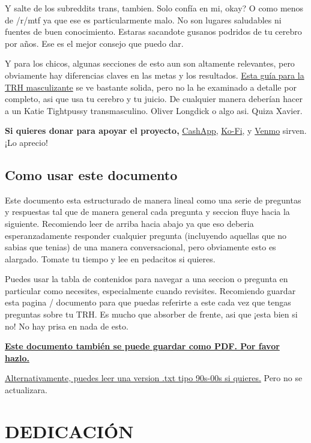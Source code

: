 \documentclass{article}
\begin{document}
Y salte de los subreddits trans, tambien. Solo confía en mi, okay? O como menos de /r/mtf ya que ese es particularmente malo. No son lugares saludables ni fuentes de buen conocimiento. Estaras sacandote gusanos podridos de tu cerebro por años. Ese es el mejor consejo que puedo dar. 

Y para los chicos, algunas secciones de esto aun son altamente relevantes, pero obviamente hay diferencias claves en las metas y los resultados. \href{https://mega.nz/folder/cfwSmBbY#ify6kaueB8SdDD1v12t2Dw}{Esta guía para la TRH masculizante} se ve bastante solida, pero no la he examinado a detalle por completo, asi que usa tu cerebro y tu juicio. De cualquier manera deberían hacer a un Katie Tightpussy transmasculino. Oliver Longdick o algo asi. Quiza Xavier. 

\textbf{Si quieres donar para apoyar el proyecto,} \href{https://cash.app/Katitties}{CashApp}, \href{https://ko-fi.com/katitties}{Ko-Fi}, y \href{https://account.venmo.com/u/katitties}{Venmo} sirven. ¡Lo aprecio!

\subsection*{Como usar este documento}

Este documento esta estructurado de manera lineal como una serie de preguntas y respuestas tal que de manera general cada pregunta y seccion fluye hacia la siguiente. Recomiendo leer de arriba hacia abajo ya que eso deberia esperanzadamente responder cualquier pregunta (incluyendo aquellas que no sabias que tenias) de una manera conversacional, pero obviamente esto es alargado. Tomate tu tiempo y lee en pedacitos si quieres.

Puedes usar la tabla de contenidos para navegar a una seccion o pregunta en particular como necesites, especialmente cuando revisites. Recomiendo guardar esta pagina / documento para que puedas referirte a este cada vez que tengas preguntas sobre tu TRH. Es mucho que absorber de frente, asi que ¡esta bien si no! No hay prisa en nada de esto.

\noindent\textbf{\href{PDF_LINK}{Este documento también se puede guardar como PDF. Por favor hazlo.}}

\noindent\href{https://pghrt.diy/pghrtgretchensversion.txt}{Alternativamente, puedes leer una version .txt tipo 90s-00s si quieres.} Pero no se actualizara.



\section*{DEDICACIÓN}
\end{document}
